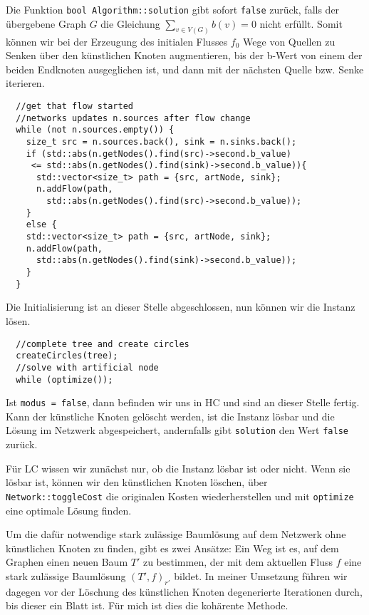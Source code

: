 Die Funktion \lstinline|bool Algorithm::solution| gibt sofort \lstinline|false| zurück, falls der übergebene Graph $G$ die Gleichung $\sum_{v\in V(G)} b(v)=0$ nicht erfüllt. Somit können wir bei der Erzeugung des initialen Flusses $f_0$ Wege von Quellen zu Senken über den künstlichen Knoten augmentieren, bis der b-Wert von einem der beiden Endknoten ausgeglichen ist, und dann mit der nächsten Quelle bzw. Senke iterieren.

\begin{lstlisting}
  //get that flow started
  //networks updates n.sources after flow change
  while (not n.sources.empty()) {
    size_t src = n.sources.back(), sink = n.sinks.back();
    if (std::abs(n.getNodes().find(src)->second.b_value)
     <= std::abs(n.getNodes().find(sink)->second.b_value)){
      std::vector<size_t> path = {src, artNode, sink};
      n.addFlow(path,
        std::abs(n.getNodes().find(src)->second.b_value));
    }
    else {
    std::vector<size_t> path = {src, artNode, sink};
    n.addFlow(path,
      std::abs(n.getNodes().find(sink)->second.b_value));
    }
  }
\end{lstlisting}

Die Initialisierung ist an dieser Stelle abgeschlossen, nun können wir die Instanz lösen.

\begin{lstlisting}
  //complete tree and create circles
  createCircles(tree);
  //solve with artificial node
  while (optimize());
\end{lstlisting}

Ist \lstinline|modus = false|, dann befinden wir uns in HC und sind an dieser Stelle fertig. Kann der künstliche Knoten gelöscht werden, ist die Instanz lösbar und die Lösung im Netzwerk abgespeichert, andernfalls gibt \lstinline|solution| den Wert \lstinline|false| zurück.

Für LC wissen wir zunächst nur, ob die Instanz lösbar ist oder nicht. Wenn sie lösbar ist, können wir den künstlichen Knoten löschen, über \lstinline|Network::toggleCost| die originalen Kosten wiederherstellen und mit \lstinline|optimize| eine optimale Lösung finden.

Um die dafür notwendige stark zulässige Baumlösung auf dem Netzwerk ohne künstlichen Knoten zu finden, gibt es zwei Ansätze: Ein Weg ist es, auf dem Graphen einen neuen Baum $T'$ zu bestimmen, der mit dem aktuellen Fluss $f$ eine stark zulässige Baumlösung $(T',f)_{r'}$ bildet. In meiner Umsetzung führen wir dagegen vor der Löschung des künstlichen Knoten degenerierte Iterationen durch, bis dieser ein Blatt ist. Für mich ist dies die kohärente Methode.

